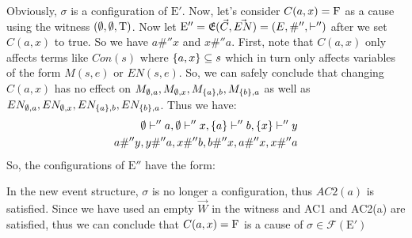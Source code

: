 \begin{example}
\begin{center}
    \end{center}
    Obviously, $\sigma$ is a configuration of $\mathrm{E'}$.
    Now, let's consider $C(a,x) = \mathrm{F}$ as a cause using the witness
    $(\emptyset,\emptyset,\mathrm{T})$.
    Now let $\mathrm{E}'' = \mathfrak{E}(\vec C,\vec {EN}) = (E, \#'',\vdash'')$ after we set $C(a,x)$ to true. So we have $a\#''x$ and $x\#''a$.
    First, note that $C(a,x)$ only affects terms like $Con(s)$ 
    where $ \{a,x\} \subseteq s$ which in turn only affects 
    variables of the form $M(s,e)$ or $EN(s,e)$.
    So, we can safely conclude that changing $C(a,x)$ has no effect
    on $M_{\emptyset,a},M_{\emptyset,x},M_{\{a\},b},M_{\{b\},a}$ as well as
    $EN_{\emptyset,a},EN_{\emptyset,x},EN_{\{a\},b},EN_{\{b\},a}$.
    Thus we have:
    \begin{align*}
        \emptyset \vdash'' a, 
        \emptyset \vdash'' x, 
        \{a\} \vdash'' b, 
        \{x\} \vdash'' y \\
        a\#''y,y\#''a,x\#''b,b\#''x,a\#''x, x\#''a
    \end{align*}
    So, the configurations of $\mathrm{E}''$ have the form:
    \begin{center}
    \end{center}
    In the new event structure, $\sigma$ is no longer a configuration, thus $AC2(a)$ is satisfied.
    Since we have used an empty $\vec W$ in the witness and AC1 and AC2(a)
    are satisfied, thus we can conclude that $C(a,x) = \mathrm{F}$ is a cause of
    $\sigma \in \mathcal{F}(\mathrm{E}')$


\end{example}

